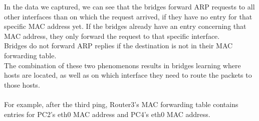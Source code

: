 In the data we captured, we can see that the bridges forward ARP requests to all other interfaces than on which the request arrived, if they have no entry for that specific MAC address yet. If the bridges already have an entry concerning that MAC address, they only forward the request to that specific interface. \\
Bridges do not forward ARP replies if the destination is not in their MAC forwarding table. \\
The combination of these two phenomenons results in bridges learning where hosts are located, as well as on which interface they need to route the packets to those hosts.
\\ \\
For example, after the third ping, Router3's MAC forwarding table contains entries for PC2's eth0 MAC address and PC4's eth0 MAC address. \\


